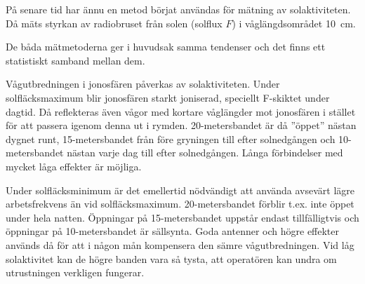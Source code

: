 
På senare tid har ännu en metod börjat användas för mätning av
solaktiviteten. Då mäts styrkan av radiobruset från solen (solflux
\(F\)) i våglängdsområdet 10~cm.

De båda mätmetoderna ger i huvudsak samma tendenser och det finns ett
statistiskt samband mellan dem.

Vågutbredningen i jonosfären påverkas av solaktiviteten. Under
solfläcksmaximum blir jonosfären starkt joniserad, speciellt F-skiktet
under dagtid. Då reflekteras även vågor med kortare våglängder mot
jonosfären i stället för att passera igenom denna ut i
rymden. 20-metersbandet är då ''öppet'' nästan dygnet runt,
15-metersbandet från före gryningen till efter solnedgången och
10-metersbandet nästan varje dag till efter solnedgången. Långa
förbindelser med mycket låga effekter är möjliga.

Under solfläcksminimum är det emellertid nödvändigt att använda
avsevärt lägre arbetsfrekvens än vid solfläcksmaximum.
20-metersbandet förblir t.ex. inte öppet under hela natten. Öppningar
på 15-metersbandet uppstår endast tillfälligtvis och öppningar på
10-metersbandet är sällsynta.  Goda antenner och högre effekter
används då för att i någon mån kompensera den sämre
vågutbredningen. Vid låg solaktivitet kan de högre banden vara så
tysta, att operatören kan undra om utrustningen verkligen fungerar.
